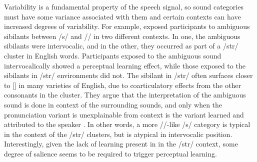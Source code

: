 Variability is a fundamental property of the speech signal, so sound categories must have some variance associated with them and certain contexts can have increased degrees of variability.
For example, \citet{Kraljic2008a} exposed participants to ambiguous sibilants between /s/ and /\textesh/ in two different contexts.  
In one, the ambiguous sibilants were intervocalic, and in the other, they occurred as part of a /str/ cluster in English words.  
Participants exposed to the ambiguous sound intervocalically showed a perceptual learning effect, while those exposed to the sibilants in /str/ environments did not.  
The sibilant in /str/ often surfaces closer to [\textesh] in many varieties of English, due to coarticulatory effects from the other consonants in the cluster.  
They argue that the interpretation of the ambiguous sound is done in context of the surrounding sounds, and only when the pronunciation variant is unexplainable from context is the variant learned and attributed to the speaker \citep[see also][]{Kraljic2008}.
In other words, a more /\textesh/-like /s/ category is typical in the context of the /str/ clusters, but is atypical in intervocalic position.
Interestingly, given the lack of learning present in in the /str/ context, some degree of salience seems to be required to trigger perceptual learning.

